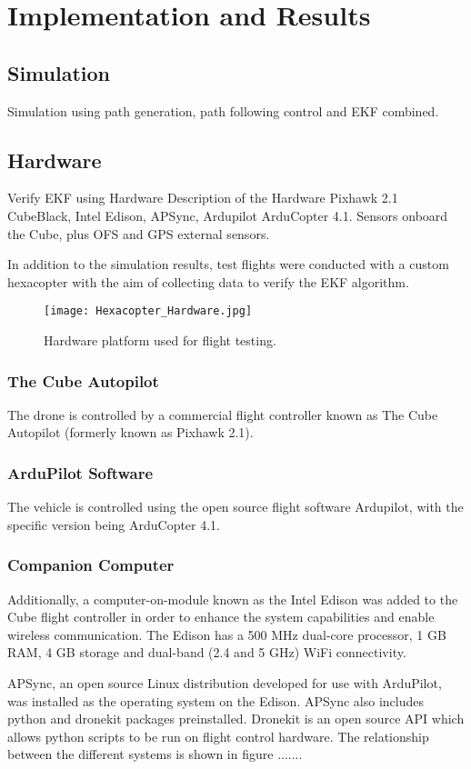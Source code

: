 
\chapter{Implementation and Results}

\section{Simulation}
Simulation using path generation, path following control and EKF combined.
\section{Hardware}\label{section:Hardware}
Verify EKF using Hardware
Description of the Hardware
Pixhawk 2.1 CubeBlack, Intel Edison, APSync, Ardupilot ArduCopter 4.1. 
Sensors onboard the Cube, plus OFS and GPS external sensors.

In addition to the simulation results, test flights were conducted with a custom hexacopter with the aim of collecting data to verify the EKF algorithm.

\begin{figure}[htb]
	\texttt{[image: Hexacopter\_Hardware.jpg]}%
	\caption{Hardware platform used for flight testing.}%
	\label{fig:hardware}%
\end{figure}

\subsection{The Cube Autopilot}
The drone is controlled by a commercial flight controller known as The Cube Autopilot (formerly known as Pixhawk 2.1).
\subsection{ArduPilot Software}
The vehicle is controlled using the open source flight software Ardupilot, with the specific version being ArduCopter 4.1.
\subsection{Companion Computer}
Additionally, a computer-on-module known as the Intel Edison was added to the Cube flight controller in order to enhance the system capabilities and enable wireless communication. The Edison has a 500 MHz dual-core processor, 1 GB RAM, 4 GB storage and dual-band (2.4 and 5 GHz) WiFi connectivity.

APSync, an open source Linux distribution developed for use with ArduPilot, was installed as the operating system on the Edison. APSync also includes python and dronekit packages preinstalled. Dronekit is an open source API which allows python scripts to be run on flight control hardware. The relationship between the different systems is shown in figure .......

